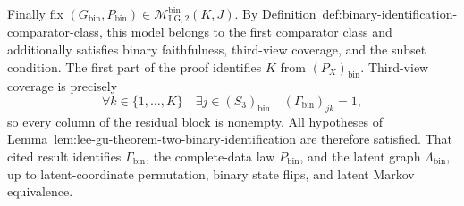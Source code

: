 Finally fix
\((G_{\mathrm{bin}},P_{\mathrm{bin}})\in
\mathcal M_{\mathrm{LG},2}^{\mathrm{bin}}(K,J)\).  By
Definition~\textnormal{def:binary-identification-comparator-class}, this model
belongs to the first comparator class and additionally satisfies binary
faithfulness, third-view coverage, and the subset condition.  The first part
of the proof identifies \(K\) from \((P_X)_{\mathrm{bin}}\).  Third-view
coverage is precisely
\[
 \forall k\in\{1,\ldots,K\}\quad
 \exists j\in(S_3)_{\mathrm{bin}}
 \quad (\Gamma_{\mathrm{bin}})_{jk}=1,
\]
so every column of the residual block is nonempty.  All hypotheses of
Lemma~\textnormal{lem:lee-gu-theorem-two-binary-identification} are therefore
satisfied.  That cited result identifies \(\Gamma_{\mathrm{bin}}\), the
complete-data law \(P_{\mathrm{bin}}\), and the latent graph
\(\Lambda_{\mathrm{bin}}\), up to latent-coordinate permutation, binary
state flips, and latent Markov equivalence.

